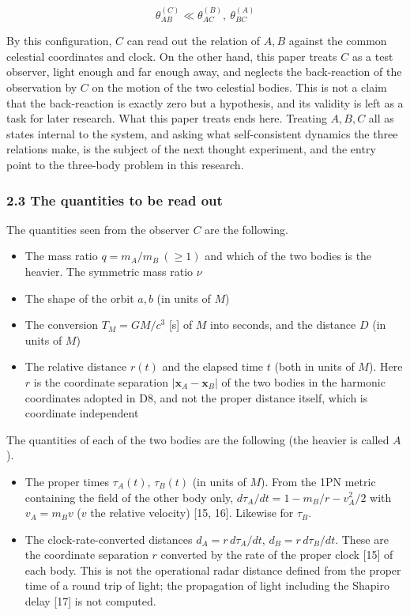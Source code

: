 \documentclass[
  a4paper,
]{article}
\providecommand{\tightlist}{%
  \setlength{\itemsep}{0pt}\setlength{\parskip}{0pt}}
\begin{document}
\[
\theta_{AB}^{(C)}\ll\theta_{AC}^{(B)},\ \theta_{BC}^{(A)}
\]

By this configuration, \(C\) can read out the relation of \(A, B\)
against the common celestial coordinates and clock. On the other hand,
this paper treats \(C\) as a test observer, light enough and far enough
away, and neglects the back-reaction of the observation by \(C\) on the
motion of the two celestial bodies. This is not a claim that the
back-reaction is exactly zero but a hypothesis, and its validity is left
as a task for later research. What this paper treats ends here. Treating
\(A, B, C\) all as states internal to the system, and asking what
self-consistent dynamics the three relations make, is the subject of the
next thought experiment, and the entry point to the three-body problem
in this research.

\subsubsection{2.3 The quantities to be read
out}\label{the-quantities-to-be-read-out}

The quantities seen from the observer \(C\) are the following.

\begin{itemize}
\tightlist
\item
  The mass ratio \(q=m_A/m_B\ (\ge 1)\) and which of the two bodies is
  the heavier. The symmetric mass ratio \(\nu\)
\item
  The shape of the orbit \(a, b\) (in units of \(M\))
\item
  The conversion \(T_M=GM/c^3\) {[}s{]} of \(M\) into seconds, and the
  distance \(D\) (in units of \(M\))
\item
  The relative distance \(r(t)\) and the elapsed time \(t\) (both in
  units of \(M\)). Here \(r\) is the coordinate separation
  \(|\mathbf x_A-\mathbf x_B|\) of the two bodies in the harmonic
  coordinates adopted in D8, and not the proper distance itself, which
  is coordinate independent
\end{itemize}

The quantities of each of the two bodies are the following (the heavier
is called \(A\)).

\begin{itemize}
\tightlist
\item
  The proper times \(\tau_A(t)\), \(\tau_B(t)\) (in units of \(M\)).
  From the 1PN metric containing the field of the other body only,
  \(d\tau_A/dt=1-m_B/r-v_A^2/2\) with \(v_A=m_Bv\) (\(v\) the relative
  velocity) {[}15, 16{]}. Likewise for \(\tau_B\).
\item
  The clock-rate-converted distances \(d_A=r\,d\tau_A/dt\),
  \(d_B=r\,d\tau_B/dt\). These are the coordinate separation \(r\)
  converted by the rate of the proper clock {[}15{]} of each body. This
  is not the operational radar distance defined from the proper time of
  a round trip of light; the propagation of light including the Shapiro
  delay {[}17{]} is not computed.
\end{itemize}
\end{document}
